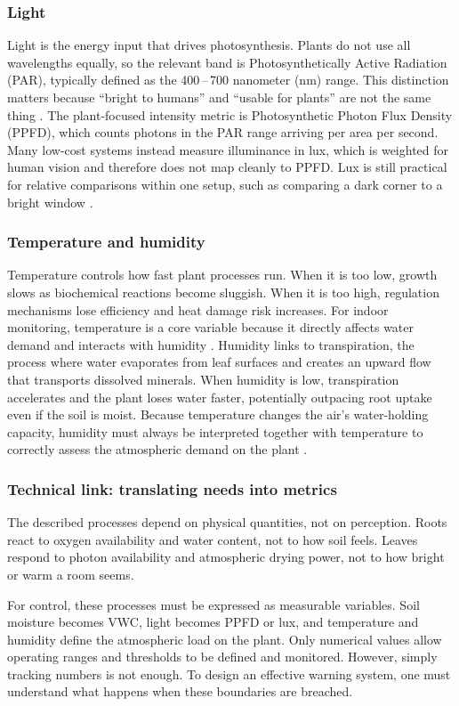 \subsubsection*{Light}
Light is the energy input that drives photosynthesis. Plants do not use all wavelengths equally, so the relevant band is Photosynthetically Active Radiation (PAR), typically defined as the 400\,--\,700 nanometer (nm) range. This distinction matters because ``bright to humans'' and ``usable for plants'' are not the same thing \cite{nasaPAR2}.
The plant-focused intensity metric is Photosynthetic Photon Flux Density (PPFD), which counts photons in the PAR range arriving per area per second. Many low-cost systems instead measure illuminance in lux, which is weighted for human vision and therefore does not map cleanly to PPFD. Lux is still practical for relative comparisons within one setup, such as comparing a dark corner to a bright window \cite{apogeePpfdLux}.
\subsubsection*{Temperature and humidity}
Temperature controls how fast plant processes run. When it is too low, growth slows as biochemical reactions become sluggish. When it is too high, regulation mechanisms lose efficiency and heat damage risk increases. For indoor monitoring, temperature is a core variable because it directly affects water demand and interacts with humidity \cite{ncStateSoils}.
Humidity links to transpiration, the process where water evaporates from leaf surfaces and creates an upward flow that transports dissolved minerals. When humidity is low, transpiration accelerates and the plant loses water faster, potentially outpacing root uptake even if the soil is moist. Because temperature changes the air's water-holding capacity, humidity must always be interpreted together with temperature to correctly assess the atmospheric demand on the plant \cite{britannicaTranspiration, blancaflor2025measuring}.
\subsubsection*{Technical link: translating needs into metrics}
The described processes depend on physical quantities, not on perception. Roots react to oxygen availability and water content, not to how soil feels. Leaves respond to photon availability and atmospheric drying power, not to how bright or warm a room seems.

For control, these processes must be expressed as measurable variables. Soil moisture becomes VWC, light becomes PPFD or lux, and temperature and humidity define the atmospheric load on the plant. Only numerical values allow operating ranges and thresholds to be defined and monitored. However, simply tracking numbers is not enough. To design an effective warning system, one must understand what happens when these boundaries are breached.


